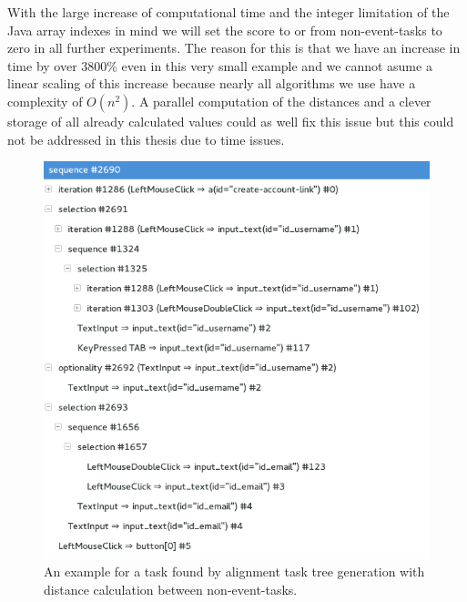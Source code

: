 With the large increase of computational time and the integer limitation of the Java array indexes in mind we will set the score to or from non-event-tasks to zero in all further experiments.
The reason for this is that we have an increase in time by over 3800\% even in this very small example and we cannot asume a linear scaling of this increase because nearly all algorithms we use have a complexity of $O(n^2)$.
A parallel computation of the distances and a clever storage of all already calculated values could as well fix this issue but this could not be addressed in this thesis due to time issues.

\begin{figure}[h]
	\centering
	\includegraphics[scale=0.75]{chapters/casestudy/noneventcreateaccount.png}
	\caption{An example for a task found by alignment task tree generation with distance calculation between non-event-tasks.}
	\label{fig:noneventaccountcreation}
\end{figure}

